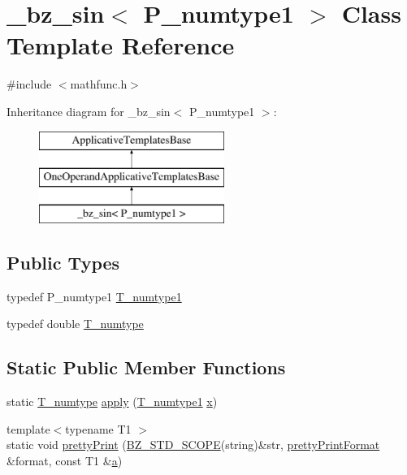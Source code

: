 \hypertarget{class__bz__sin}{}\section{\+\_\+bz\+\_\+sin$<$ P\+\_\+numtype1 $>$ Class Template Reference}
\label{class__bz__sin}


{\ttfamily \#include $<$mathfunc.\+h$>$}

Inheritance diagram for \+\_\+bz\+\_\+sin$<$ P\+\_\+numtype1 $>$\+:\begin{figure}[H]
\begin{center}
\leavevmode
\includegraphics[height=3.000000cm]{class__bz__sin}
\end{center}
\end{figure}
\subsection*{Public Types}
\begin{DoxyCompactItemize}
\item 
typedef P\+\_\+numtype1 \hyperlink{class__bz__sin_afd7629d49f1d5887b3c805d59bf65283}{T\+\_\+numtype1}
\item 
typedef double \hyperlink{class__bz__sin_aaf6e40c5d20b5dc0680e8eb12f8ca352}{T\+\_\+numtype}
\end{DoxyCompactItemize}
\subsection*{Static Public Member Functions}
\begin{DoxyCompactItemize}
\item 
static \hyperlink{class__bz__sin_aaf6e40c5d20b5dc0680e8eb12f8ca352}{T\+\_\+numtype} \hyperlink{class__bz__sin_a0cdf6a755d26c7a5a8425e09622b0f07}{apply} (\hyperlink{class__bz__sin_afd7629d49f1d5887b3c805d59bf65283}{T\+\_\+numtype1} \hyperlink{vecnorm1_8cc_ac73eed9e41ec09d58f112f06c2d6cb63}{x})
\item 
{\footnotesize template$<$typename T1 $>$ }\\static void \hyperlink{class__bz__sin_a486d70378a0f70bd51d399e278ab1a95}{pretty\+Print} (\hyperlink{numinquire_8h_a2b24ffc3b4ef9803956bc7715c6c7b83}{B\+Z\+\_\+\+S\+T\+D\+\_\+\+S\+C\+O\+P\+E}(string)\&str, \hyperlink{classprettyPrintFormat}{pretty\+Print\+Format} \&format, const T1 \&\hyperlink{gen__mat5files_8m_aae328bf20413f220e38aec4d95bfd6da}{a})
\end{DoxyCompactItemize}


